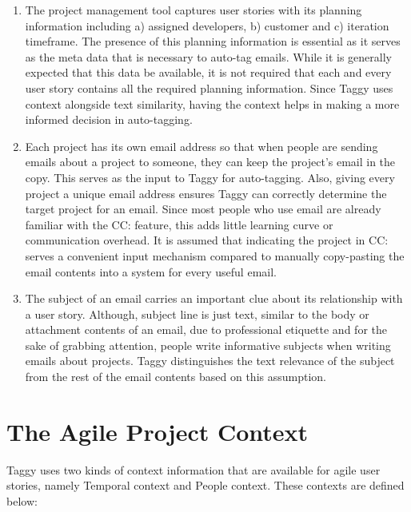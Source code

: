 \begin{enumerate}
	\item The project management tool captures user stories with its planning information including a) assigned developers, b) customer and c) iteration timeframe. The presence of this planning information is essential as it serves as the meta data that is necessary to auto-tag emails. While it is generally expected that this data be available, it is not required that each and every user story contains all the required planning information. Since Taggy uses context alongside text similarity, having the context helps in making a more informed decision in auto-tagging.
	
	\item Each project has its own email address so that when people are sending emails about a project to someone, they can keep the project's email in the copy. This serves as the input to Taggy for auto-tagging. Also, giving every project a unique email address ensures Taggy can correctly determine the target project for an email. Since most people who use email are already familiar with the CC: feature, this adds little learning curve or communication overhead. It is assumed that indicating the project in CC: serves a convenient input mechanism compared to manually copy-pasting the email contents into a system for every useful email.		
	
	\item The subject of an email carries an important clue about its relationship with a user story. Although, subject line is just text, similar to the body or attachment contents of an email, due to professional etiquette and for the sake of grabbing attention, people write informative subjects when writing emails about projects. Taggy distinguishes the text relevance of the subject from the rest of the email contents based on this assumption.
\end{enumerate}



\section{The Agile Project Context}
Taggy uses two kinds of context information that are available for agile user stories, namely Temporal context and People context. These contexts are defined below:

